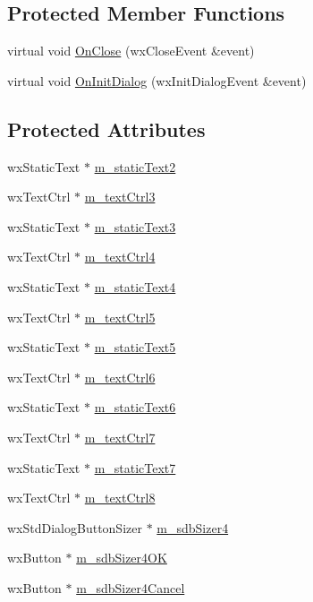 \subsection*{Protected Member Functions}
\begin{DoxyCompactItemize}
\item 
virtual void \hyperlink{class_dlg_options_aad6cf9d439aced63416da6dc04f326d7}{On\-Close} (wx\-Close\-Event \&event)
\item 
virtual void \hyperlink{class_dlg_options_ab293c5e4e64e5d2de1b9d1ee67e3a448}{On\-Init\-Dialog} (wx\-Init\-Dialog\-Event \&event)
\end{DoxyCompactItemize}
\subsection*{Protected Attributes}
\begin{DoxyCompactItemize}
\item 
wx\-Static\-Text $\ast$ \hyperlink{class_dlg_options_abdb2ecd5cdb67f4e0975b675c6d4b0c1}{m\-\_\-static\-Text2}
\item 
wx\-Text\-Ctrl $\ast$ \hyperlink{class_dlg_options_a98a1eaa6e551674e04f9f5a52a4cd786}{m\-\_\-text\-Ctrl3}
\item 
wx\-Static\-Text $\ast$ \hyperlink{class_dlg_options_a4e8c47efc358292c877acc2582d91d96}{m\-\_\-static\-Text3}
\item 
wx\-Text\-Ctrl $\ast$ \hyperlink{class_dlg_options_a7b33a3a320a8f5cbce3eff97268ebc5d}{m\-\_\-text\-Ctrl4}
\item 
wx\-Static\-Text $\ast$ \hyperlink{class_dlg_options_a82326f04c59e3bbeb706cba2653a1b18}{m\-\_\-static\-Text4}
\item 
wx\-Text\-Ctrl $\ast$ \hyperlink{class_dlg_options_aef875e819d6e463b985859b319f4197f}{m\-\_\-text\-Ctrl5}
\item 
wx\-Static\-Text $\ast$ \hyperlink{class_dlg_options_a8ad98bb2bd779da9e35984673fb79af9}{m\-\_\-static\-Text5}
\item 
wx\-Text\-Ctrl $\ast$ \hyperlink{class_dlg_options_a43f9a8d2714f7f5d8de2eada66d0f829}{m\-\_\-text\-Ctrl6}
\item 
wx\-Static\-Text $\ast$ \hyperlink{class_dlg_options_a4fdffe00b1d96ef3bf333ddf5fe05bb6}{m\-\_\-static\-Text6}
\item 
wx\-Text\-Ctrl $\ast$ \hyperlink{class_dlg_options_adba9ce87076479d390d32932f5c71a7c}{m\-\_\-text\-Ctrl7}
\item 
wx\-Static\-Text $\ast$ \hyperlink{class_dlg_options_a1d6d4b2a70e0eb5d1a998da2e5ea86c0}{m\-\_\-static\-Text7}
\item 
wx\-Text\-Ctrl $\ast$ \hyperlink{class_dlg_options_acaed1591a5e35a2750f610644cc90f29}{m\-\_\-text\-Ctrl8}
\item 
wx\-Std\-Dialog\-Button\-Sizer $\ast$ \hyperlink{class_dlg_options_ab71c6ceea19ba3ba907aa7d1d3a5a63d}{m\-\_\-sdb\-Sizer4}
\item 
wx\-Button $\ast$ \hyperlink{class_dlg_options_a7d0b24d52fdb25871dc30640f1027a51}{m\-\_\-sdb\-Sizer4\-O\-K}
\item 
wx\-Button $\ast$ \hyperlink{class_dlg_options_ae99c4b9abc19085e47108d6f8db704c6}{m\-\_\-sdb\-Sizer4\-Cancel}
\end{DoxyCompactItemize}



